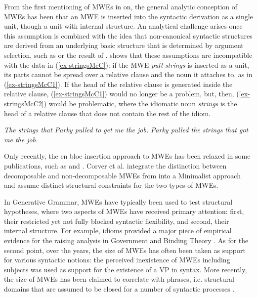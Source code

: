 \documentclass[output=paper]{langsci/langscibook}
\begin{document}
From the first mentioning of MWEs in  \citet{Chomsky:65} on, the general analytic conception of MWEs has been that an MWE is inserted into the syntactic derivation as a single unit, though a unit with internal structure. An analytical challenge arises once this assumption is combined with the idea that non-canonical syntactic structures are derived from an underlying basic structure that is determined by argument selection, such as  or the result of . \citet{McCawley:81} shows that these assumptions are incompatible with the data in (\ref{ex-stringsMcC}): if the MWE \textit{pull strings} is inserted as a unit, its parts cannot be spread over a relative clause and the noun it attaches to, as in (\ref{ex-stringsMcC1}). If the head of the relative clause is generated inside the relative clause, (\ref{ex-stringsMcC1}) would no longer be a problem, but, then, (\ref{ex-stringsMcC2}) would be problematic, where the idiomatic noun \textit{strings} is the head of a relative clause that does not contain the rest of the idiom.

\begin{exe}
\ex \label{ex-stringsMcC} 
\begin{xlist}
\ex \label{ex-stringsMcC1}
\textit{The strings that Parky pulled to get me the job.} \citep[135]{McCawley:81}
\ex \label{ex-stringsMcC2}
\textit{Parky pulled the strings that got me the job.}  \citep[137]{McCawley:81}
\end{xlist}
\end{exe}

Only recently, the en bloc insertion approach to MWEs has been relaxed in some publications, such as  \citet{Harley:Stone:13} and  \citet{vCraenenbroeck:al:16draft}. Corver et al.   integrate the distinction between decomposable and non-decomposable MWEs from \citet{Nunberg1994}  into a Minimalist approach and assume distinct structural constraints for the two types of MWEs.

In Generative Grammar, MWEs have typically been used to test structural hypotheses, where two aspects of MWEs have received primary attention: first, their restricted yet not fully blocked syntactic flexibility, and second, their internal structure. For example, idioms provided a major piece of empirical evidence for the raising analysis in Government and Binding Theory \citep{Chomsky:86a}. As for the second point, over the years, the size of MWEs has often been taken as support for various syntactic notions: the perceived inexistence of MWEs including subjects was used as support for the existence of a VP in syntax. More recently, the size of MWEs has been claimed to correlate with phrases, i.e. structural domains that are assumed to be closed for a number of syntactic processes \citep{Svenonius:05}.
\end{document}
